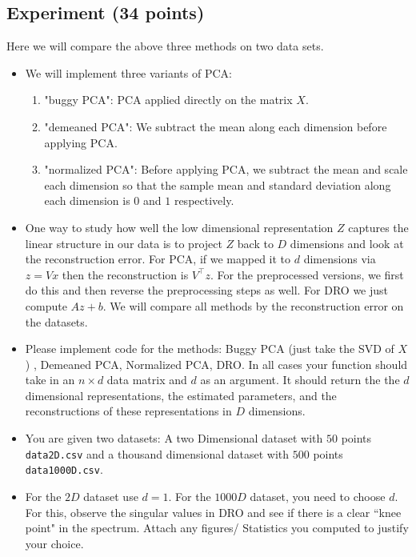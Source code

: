 \documentclass[a4paper]{article}
\theoremstyle{definition}
\begin{document}
\subsection{Experiment (34 points)}

Here we will compare the above three methods on two data sets. 

\begin{itemize}
\item We will implement three variants of PCA:
\begin{enumerate}
    \item "buggy PCA": PCA applied directly on the matrix $X$.
    \item "demeaned PCA": We subtract the mean along each dimension before applying PCA.
    \item "normalized PCA": Before applying PCA, we subtract the mean and scale each dimension so that the sample  mean and standard deviation along each dimension is $0$ and $1$ respectively.
    
\end{enumerate}



\item 
One way to study how well the low dimensional representation $Z$ captures the linear
structure in our data is to project $Z$ back to $D$ dimensions and look at the reconstruction
error. For PCA, if we mapped it to $d$ dimensions via $z = Vx$ then the
reconstruction is $V^\top z$. For the preprocessed versions, we first do this and then
reverse the preprocessing steps as well. For DRO  we just compute $Az + b$.
We will compare all methods by the reconstruction error on the datasets.

\item 
Please implement code for the methods: Buggy PCA (just take the SVD of $X$)
, Demeaned PCA,
Normalized PCA, DRO. In all cases your function should take in
an $n \times d$ data matrix and $d$ as an argument. It should return the
the $d$ dimensional representations, the estimated parameters, and the
reconstructions of these representations in $D$ dimensions. 

\item
You are given two datasets: A two Dimensional dataset with $50$ points 
\texttt{data2D.csv} and a thousand dimensional dataset with $500$ points
\texttt{data1000D.csv}. 

\item
For the $2D$ dataset use $d=1$. For the $1000D$ dataset, you need to choose
$d$. For this, observe the singular values in DRO and see if there is a clear
``knee point" in the spectrum.
Attach any figures/ Statistics you computed to justify your choice.


\end{itemize}
\end{document}

